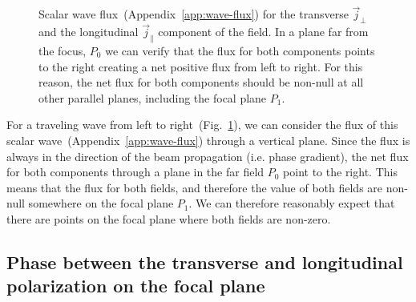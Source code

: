 \documentclass[10pt,fleqn]{article}
\begin{document}
\begin{figure}[h]
  \centering
  \caption{Scalar wave flux~(Appendix~\ref{app:wave-flux})
    for the transverse $\vec j_{\perp}$ and the longitudinal
    $\vec j_{\parallel}$ component of the field.
    In a plane far from the focus, $P_0$ we can verify that
    the flux for both components points to the right
    creating a net positive flux from left to right.
    For this reason, the net flux for both components should be non-null
    at all other parallel planes, including the focal plane $P_1$.}
  \label{circ-pol:continuity}
\end{figure}


For a traveling wave from left to right~(Fig.~\ref{circ-pol:continuity}),
we can consider the flux of this scalar wave~(Appendix~\ref{app:wave-flux})
through a vertical plane. Since the flux is always in the direction
of the beam propagation (i.e. phase gradient), the net flux for both components
through a plane in the far field $P_0$ point to the right.
This means that the flux for both fields, and therefore the value of both fields
are non-null somewhere on the focal plane $P_1$.
We can therefore reasonably expect that there are points on the focal plane
where both fields are non-zero.

\subsection{Phase between the transverse and longitudinal polarization on the focal plane}
\end{document}
